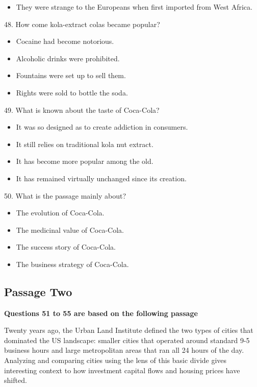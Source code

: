 \documentclass[UTF8,11pt]{ctexart}
\begin{document}
\begin{itemize}[leftmargin=2em,itemsep=.2em,topsep=.4em]\item[D.] They were strange to the Europeans when first imported from West Africa.
\end{itemize}

48. How come kola-extract colas became popular?


\begin{itemize}[leftmargin=2em,itemsep=.2em,topsep=.4em]\item[A.] Cocaine had become notorious.
\item[B.] Alcoholic drinks were prohibited.
\item[C.] Fountains were set up to sell them.
\item[D.] Rights were sold to bottle the soda.
\end{itemize}

49. What is known about the taste of Coca-Cola?


\begin{itemize}[leftmargin=2em,itemsep=.2em,topsep=.4em]\item[A.] It was so designed as to create addiction in consumers.
\item[B.] It still relies on traditional kola nut extract.
\item[C.] It has become more popular among the old.
\item[D.] It has remained virtually unchanged since its creation.
\end{itemize}

50. What is the passage mainly about?


\begin{itemize}[leftmargin=2em,itemsep=.2em,topsep=.4em]\item[A.] The evolution of Coca-Cola.
\item[B.] The medicinal value of Coca-Cola.
\item[C.] The success story of Coca-Cola.
\item[D.] The business strategy of Coca-Cola.
\end{itemize}

\subsection*{\textbf{Passage Two}}


\textbf{Questions 51 to 55 are based on the following passage}


Twenty years ago, the Urban Land Institute defined the two types of cities that dominated the US landscape: smaller cities that operated around standard 9-5 business hours and large metropolitan areas that ran all 24 hours of the day. Analyzing and comparing cities using the lens of this basic divide gives interesting context to how investment capital flows and housing prices have shifted.
\end{document}
